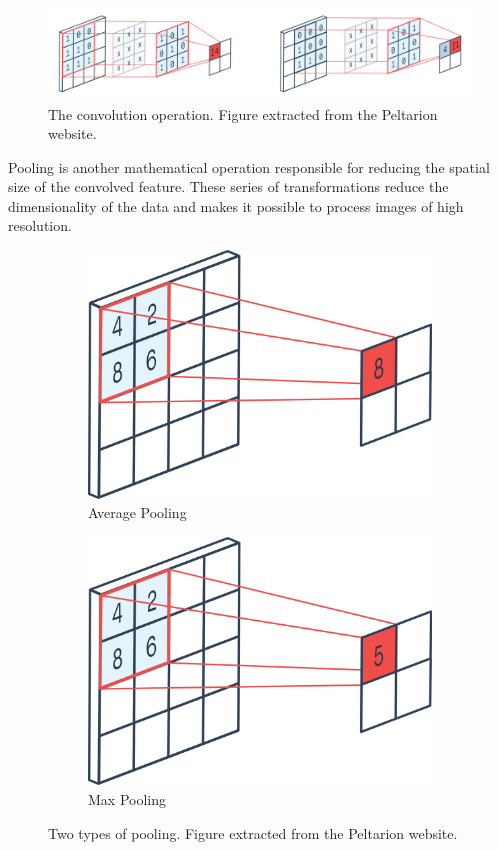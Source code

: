 \begin{figure}[h!tp]
    \centering
    \includegraphics[width=.89\textwidth]{imgs/chap3_convolution.png}
    \caption[The convolution operation.]{The convolution operation. Figure extracted from the Peltarion website\footnotemark.}
    \label{fig:convolution}
\end{figure}


Pooling is another mathematical operation responsible for reducing the spatial size of the convolved feature. These series of transformations reduce the dimensionality of the data and makes it possible to process images of high resolution. 

\begin{figure}[h!tp]
\centering
\begin{subfigure}{.45\textwidth}
  \centering
  \includegraphics[width=.5\linewidth]{imgs/chap3_max_pooling.png}
  \caption{Average Pooling}
  \label{fig:sub1}
\end{subfigure}
\begin{subfigure}{.45\textwidth}
  \centering
  \includegraphics[width=.5\linewidth]{imgs/chap3_avg_pooling.png}
  \caption{Max Pooling}
  \label{fig:sub2}
\end{subfigure}
\caption[Two types of pooling.]{Two types of pooling. Figure extracted from the Peltarion website\footnotemark.}
\label{fig:pooling}
\end{figure}

